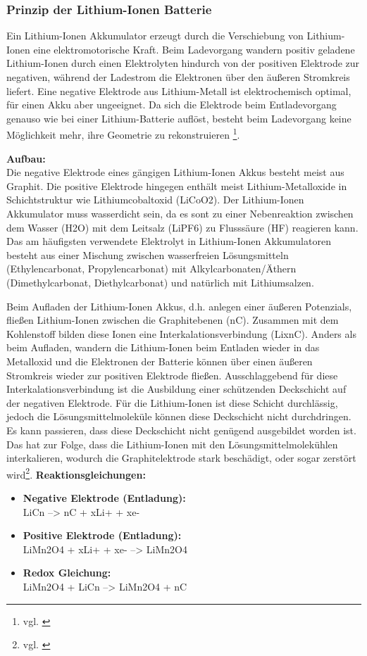 \subsubsection{Prinzip der Lithium-Ionen Batterie}
Ein Lithium-Ionen Akkumulator erzeugt durch die Verschiebung von Lithium-Ionen eine elektromotorische Kraft.
Beim Ladevorgang wandern positiv geladene Lithium-Ionen durch einen Elektrolyten hindurch von der positiven Elektrode zur negativen, während der Ladestrom die Elektronen über den äußeren Stromkreis liefert. Eine negative Elektrode aus Lithium-Metall ist elektrochemisch optimal, für einen Akku aber ungeeignet. Da sich die Elektrode beim Entladevorgang genauso wie bei einer Lithium-Batterie auflöst, besteht beim Ladevorgang keine Möglichkeit mehr, ihre Geometrie zu rekonstruieren
\footnote{vgl. \cite{Lithium-Ionen-AkkumulatorPrinzip}}.

\textbf{Aufbau:}\\
Die negative Elektrode eines gängigen Lithium-Ionen Akkus besteht meist aus Graphit. Die positive Elektrode hingegen enthält meist Lithium-Metalloxide in Schichtstruktur wie Lithiumcobaltoxid (LiCoO2). Der Lithium-Ionen Akkumulator muss wasserdicht sein, da es sont zu einer Nebenreaktion zwischen dem Wasser (H2O) mit dem Leitsalz (LiPF6) zu Flusssäure (HF) reagieren kann. Das am häufigsten verwendete Elektrolyt in Lithium-Ionen Akkumulatoren besteht aus einer Mischung zwischen wasserfreien Lösungsmitteln (Ethylencarbonat, Propylencarbonat) mit Alkylcarbonaten/Äthern (Dimethylcarbonat, Diethylcarbonat) und natürlich mit Lithiumsalzen.

Beim Aufladen der Lithium-Ionen Akkus, d.h. anlegen einer äußeren Potenzials, fließen Lithium-Ionen zwischen die Graphitebenen (nC). Zusammen mit dem Kohlenstoff bilden diese Ionen eine Interkalationsverbindung (LixnC). 
Anders als beim Aufladen, wandern die Lithium-Ionen beim Entladen wieder in das Metalloxid und die Elektronen der Batterie können über einen äußeren Stromkreis wieder zur positiven Elektrode fließen. 
Ausschlaggebend für diese Interkalationsverbindung ist die Ausbildung einer schützenden Deckschicht auf der negativen Elektrode. Für die Lithium-Ionen ist diese Schicht durchlässig, jedoch die Lösungsmittelmoleküle können diese Deckschicht nicht durchdringen. Es kann passieren, dass diese Deckschicht nicht genügend ausgebildet worden ist. Das hat zur Folge, dass die Lithium-Ionen mit den Lösungsmittelmolekühlen interkalieren, wodurch die Graphitelektrode stark beschädigt, oder sogar zerstört wird\footnote{vgl. \cite{Lithium-Ionen-AkkumulatorAufbau}}.
\newpage
\textbf{Reaktionsgleichungen:}
\begin{itemize}
	\item \textbf{Negative Elektrode (Entladung):}\\
	LiCn  -->  nC + xLi+ + xe-

	\item \textbf{Positive Elektrode (Entladung):}\\
	LiMn2O4 + xLi+ + xe-  -->  LiMn2O4

	\item \textbf{Redox Gleichung:}\\
	LiMn2O4 + LiCn  -->  LiMn2O4 + nC
\end{itemize}

